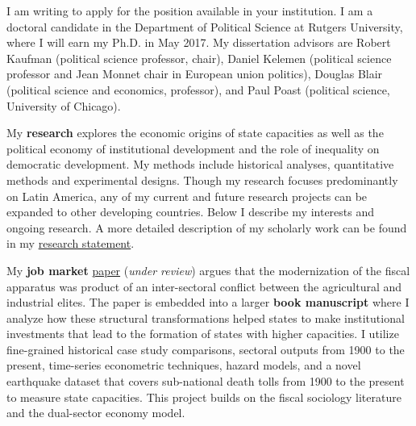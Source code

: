 \documentclass[10pt,stdletter,dateno,sigleft]{newlfm} %
\begin{document}
\begin{newlfm}


\vspace{-0.3cm}I am writing to apply for the position available in your institution. I am a doctoral candidate in the Department of Political Science at Rutgers University, where I will earn my Ph.D. in May 2017. My dissertation advisors are Robert Kaufman (political science professor, chair), Daniel Kelemen (political science professor and Jean Monnet chair in European union politics), Douglas Blair (political science and economics, professor), and Paul Poast (political science, University of Chicago).

My {\bf research} explores the economic origins of state capacities as well as the political economy of institutional development and the role of inequality on democratic development. My methods include historical analyses, quantitative methods and experimental designs. Though my research focuses predominantly on Latin America, any of my current and future research projects can be expanded to other developing countries. Below I describe my interests and ongoing research. A more detailed description of my scholarly work can be found in my \href{http://github.com/hbahamonde/Job_Market/raw/master/Bahamonde_Research_Statement.pdf}{research statement}.


My {\bf job market} \href{https://github.com/hbahamonde/IncomeTaxAdoption/raw/master/Bahamonde_IncomeTaxAdoption.pdf}{paper} (\emph{under review}) argues that the modernization of the fiscal apparatus was product of an inter-sectoral conflict between the agricultural and industrial elites. The paper is embedded into a larger {\bf book manuscript} where I analyze how these structural transformations helped states to make institutional investments that lead to the formation of states with higher capacities. I utilize fine-grained historical case study comparisons, sectoral outputs from 1900 to the present, time-series econometric techniques, hazard models, and a novel earthquake dataset that covers sub-national death tolls from 1900 to the present to measure state capacities. This project builds on the fiscal sociology literature and the dual-sector economy model. 


\end{newlfm}
\end{document}
